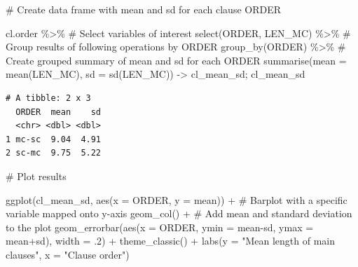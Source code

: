 \documentclass[
  11pt,
  letterpaper,
  DIV=11,
  numbers=noendperiod]{scrreprt}
\newenvironment{Shaded}{\begin{snugshade}}{\end{snugshade}}
\newcommand{\AttributeTok}[1]{\textcolor[rgb]{0.40,0.45,0.13}{#1}}
\newcommand{\CommentTok}[1]{\textcolor[rgb]{0.37,0.37,0.37}{#1}}
\newcommand{\DecValTok}[1]{\textcolor[rgb]{0.68,0.00,0.00}{#1}}
\newcommand{\FunctionTok}[1]{\textcolor[rgb]{0.28,0.35,0.67}{#1}}
\newcommand{\NormalTok}[1]{\textcolor[rgb]{0.00,0.23,0.31}{#1}}
\newcommand{\OtherTok}[1]{\textcolor[rgb]{0.00,0.23,0.31}{#1}}
\newcommand{\SpecialCharTok}[1]{\textcolor[rgb]{0.37,0.37,0.37}{#1}}
\newcommand{\StringTok}[1]{\textcolor[rgb]{0.13,0.47,0.30}{#1}}
\begin{document}
\begin{Shaded}
\begin{Highlighting}[]
\CommentTok{\# Create data frame with mean and sd for each clause ORDER}

\NormalTok{cl.order }\SpecialCharTok{\%\textgreater{}\%} 
  \CommentTok{\# Select variables of interest}
  \FunctionTok{select}\NormalTok{(ORDER, LEN\_MC) }\SpecialCharTok{\%\textgreater{}\%} 
  \CommentTok{\# Group results of following operations by ORDER}
  \FunctionTok{group\_by}\NormalTok{(ORDER) }\SpecialCharTok{\%\textgreater{}\%} 
    \CommentTok{\# Create grouped summary of mean and sd for each ORDER}
    \FunctionTok{summarise}\NormalTok{(}\AttributeTok{mean =} \FunctionTok{mean}\NormalTok{(LEN\_MC),}
                \AttributeTok{sd =} \FunctionTok{sd}\NormalTok{(LEN\_MC)) }\OtherTok{{-}\textgreater{}}\NormalTok{ cl\_mean\_sd; cl\_mean\_sd}
\end{Highlighting}
\end{Shaded}

\begin{verbatim}
# A tibble: 2 x 3
  ORDER  mean    sd
  <chr> <dbl> <dbl>
1 mc-sc  9.04  4.91
2 sc-mc  9.75  5.22
\end{verbatim}

\begin{Shaded}
\begin{Highlighting}[]
\CommentTok{\# Plot results }

\FunctionTok{ggplot}\NormalTok{(cl\_mean\_sd, }\FunctionTok{aes}\NormalTok{(}\AttributeTok{x =}\NormalTok{ ORDER, }\AttributeTok{y =}\NormalTok{ mean)) }\SpecialCharTok{+}
  \CommentTok{\# Barplot with a specific variable mapped onto y{-}axis}
  \FunctionTok{geom\_col}\NormalTok{() }\SpecialCharTok{+}
  \CommentTok{\# Add mean and standard deviation to the plot}
  \FunctionTok{geom\_errorbar}\NormalTok{(}\FunctionTok{aes}\NormalTok{(}\AttributeTok{x =}\NormalTok{ ORDER,}
                    \AttributeTok{ymin =}\NormalTok{ mean}\SpecialCharTok{{-}}\NormalTok{sd,}
                    \AttributeTok{ymax =}\NormalTok{ mean}\SpecialCharTok{+}\NormalTok{sd), }\AttributeTok{width =}\NormalTok{ .}\DecValTok{2}\NormalTok{) }\SpecialCharTok{+}
  \FunctionTok{theme\_classic}\NormalTok{() }\SpecialCharTok{+}
  \FunctionTok{labs}\NormalTok{(}\AttributeTok{y =} \StringTok{"Mean length of main clauses"}\NormalTok{, }\AttributeTok{x =} \StringTok{"Clause order"}\NormalTok{)}
\end{Highlighting}
\end{Shaded}
\end{document}
